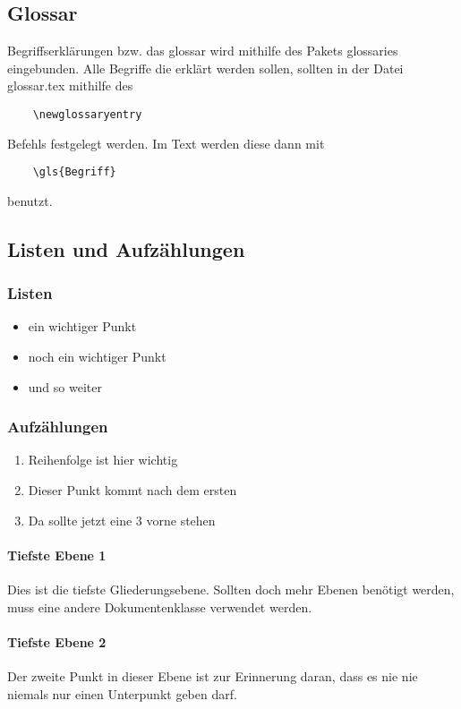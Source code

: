 \subsection{Glossar}
Begriffserklärungen bzw. das \gls{glossar} wird mithilfe des Pakets \gls{glossaries} eingebunden. Alle Begriffe die erklärt werden sollen, sollten in der Datei glossar.tex mithilfe des \begin{verbatim}
	\newglossaryentry
\end{verbatim} Befehls festgelegt werden. Im Text werden diese dann mit \begin{verbatim}
	\gls{Begriff}
\end{verbatim} benutzt.


\subsection{Listen und Aufzählungen}
\subsubsection{Listen}
\begin{itemize}
\item ein wichtiger Punkt
\item noch ein wichtiger Punkt
\item und so weiter
\end{itemize}
\subsubsection{Aufzählungen}
\begin{enumerate}
\item Reihenfolge ist hier wichtig
\item Dieser Punkt kommt nach dem ersten
\item Da sollte jetzt eine 3 vorne stehen
\end{enumerate}

\paragraph{Tiefste Ebene 1}
Dies ist die tiefste Gliederungsebene. Sollten doch mehr Ebenen benötigt werden, muss eine andere Dokumentenklasse verwendet werden.

\paragraph{Tiefste Ebene 2}
Der zweite Punkt in dieser Ebene ist zur Erinnerung daran, dass es nie nie niemals nur einen Unterpunkt geben darf.

